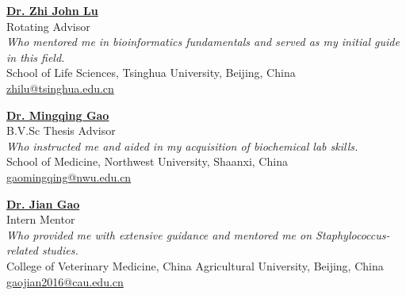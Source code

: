 \vspace{4pt}


\textbf{\href{https://life.tsinghua.edu.cn/lifeen/info/1034/1083.htm}{Dr. Zhi John Lu}}\\
Rotating Advisor\\
\textit{Who mentored me in bioinformatics fundamentals and served as my initial guide in this field.}\\
School of Life Sciences, Tsinghua University, Beijing, China\\
\href{mailto:zhilu@tsinghua.edu.cn}{zhilu@tsinghua.edu.cn}\\

\vspace{4pt}


\textbf{\href{https://faculty.nwu.edu.cn/gaomingqing/zh_CN/index.htm}{Dr. Mingqing Gao}}\\
B.V.Sc Thesis Advisor\\
\textit{Who instructed me and aided in my acquisition of biochemical lab skills.}\\
School of Medicine, Northwest University, Shaanxi, China\\
\href{mailto:gaomingqing@nwu.edu.cn}{gaomingqing@nwu.edu.cn}\\


\vspace{4pt}


\textbf{\href{https://cvm.cau.edu.cn/art/2017/9/12/art_41957_71.html}{Dr. Jian Gao}}\\
Intern Mentor \\
\textit{Who provided me with extensive guidance and mentored me on \textit{Staphylococcus}-related studies.} \\
College of Veterinary Medicine, China Agricultural University, Beijing, China\\
\href{mailto:gaojian2016@cau.edu.cn}{gaojian2016@cau.edu.cn}\\



